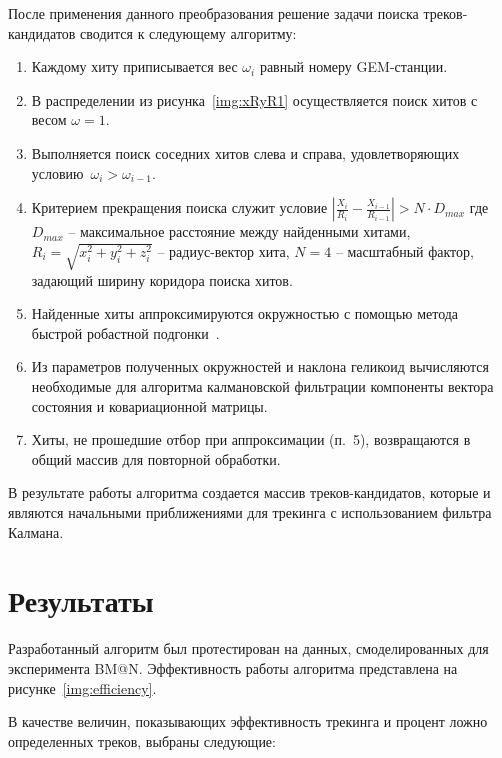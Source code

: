 \documentclass[a4paper, 12pt]{extreport}  %
\begin{document}
После применения данного преобразования решение задачи поиска треков-кандидатов
сводится к следующему алгоритму:
\begin{enumerate}

\item Каждому хиту приписывается вес $\omega_i$ равный номеру GEM-станции.

\item В распределении из рисунка~\ref{img:xRyR1} осуществляется поиск хитов с весом
$\omega = 1$.

\item Выполняется поиск соседних хитов слева и справа, удовлетворяющих 
условию~$\omega_i > \omega_{i-1}$.

\item Критерием прекращения поиска служит условие $|\frac{X_i}{R_i} -
\frac{X_{i-1}}{R_{i-1}}| > N \cdot D_{max}$ где $D_{max}$ -- максимальное
расстояние между найденными хитами, $R_i = \sqrt{x_i^2 + y_i^2 + z_i^2}$ --
радиус-вектор хита, $N = 4$ -- масштабный фактор, задающий ширину коридора
поиска хитов.

\item Найденные хиты аппроксимируются окружностью с помощью метода быстрой
робастной подгонки~\cite{circ1, circ2}.

\item Из параметров полученных окружностей и наклона геликоид вычисляются
необходимые для алгоритма калмановской фильтрации компоненты вектора состояния и
ковариационной матрицы.

\item Хиты, не прошедшие отбор при аппроксимации (п.~5), возвращаются в
общий массив для повторной обработки.
\end{enumerate}

В результате работы алгоритма создается массив треков-кандидатов, которые и
являются начальными приближениями для трекинга с использованием фильтра Калмана.

\section*{Результаты}

Разработанный алгоритм был протестирован на данных, смоделированных для
эксперимента BM@N. Эффективность работы алгоритма представлена на
рисунке~\ref{img:efficiency}.

В качестве величин, показывающих эффективность трекинга и процент ложно
определенных треков, выбраны следующие:
\end{document}
